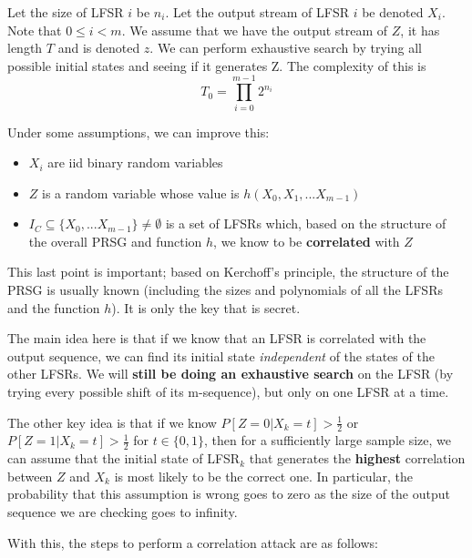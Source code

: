 \documentclass[11pt]{report}
\begin{document}
Let the size of LFSR $i$ be $n_i$. Let the output stream of LFSR $i$ be denoted $X_i$. Note that $0 \le i < m$. We assume that we have the output stream of $Z$, it has length $T$ and is denoted $z$. We can perform exhaustive search by trying all possible initial states and seeing if it generates Z. The complexity of this is
\begin{equation}
	T_0 = \prod_{i=0}^{m-1} 2^{n_i}
\end{equation}

Under some assumptions, we can improve this:
\begin{itemize}
	\item $X_i$ are iid binary random variables
	\item $Z$ is a random variable whose value is $h(X_0, X_1, ... X_{m-1})$
	\item $I_C \subseteq \{X_0, ... X_{m-1}\} \neq \emptyset$ is a set of LFSRs which, based on the structure of the overall PRSG and function $h$, we know to be \textbf{correlated} with $Z$
\end{itemize}

This last point is important; based on Kerchoff's principle, the structure of the PRSG is usually known (including the sizes and polynomials of all the LFSRs and the function $h$). It is only the key that is secret.

The main idea here is that if we know that an LFSR is correlated with the output sequence, we can find its initial state \textit{independent} of the states of the other LFSRs. We will \textbf{still be doing an exhaustive search} on the LFSR (by trying every possible shift of its m-sequence), but only on one LFSR at a time.

The other key idea is that if we know $P[Z = 0 | X_k = t] > \frac{1}{2}$ or $P[Z = 1 | X_k = t] > \frac{1}{2}$ for $t \in \{0, 1\}$, then for a sufficiently large sample size, we can assume that the initial state of LFSR$_k$ that generates the \textbf{highest} correlation between $Z$ and $X_k$ is most likely to be the correct one. In particular, the probability that this assumption is wrong goes to zero as the size of the output sequence we are checking goes to infinity.

With this, the steps to perform a correlation attack are as follows:
\end{document}
